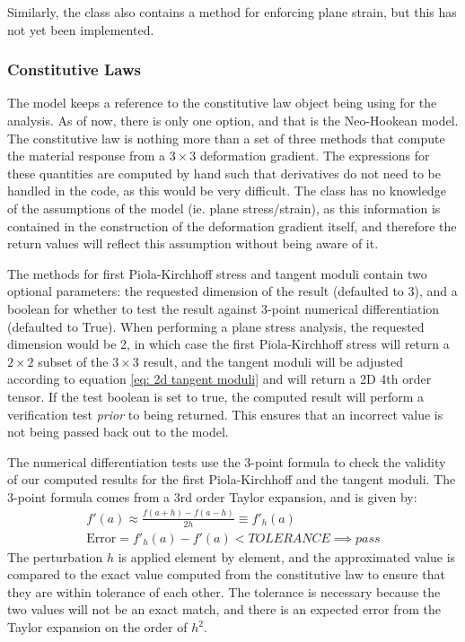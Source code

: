 \documentclass[]{spie}  %
\begin{document}
Similarly, the class also contains a method for enforcing plane strain, but this has not yet been implemented. 

\subsubsection{Constitutive Laws}
The model keeps a reference to the constitutive law object being using for the analysis. As of now, there is only one option, and that is the Neo-Hookean model. The constitutive law is nothing more than a set of three methods that compute the material response from a $3 \times 3$ deformation gradient. The expressions for these quantities are computed by hand such that derivatives do not need to be handled in the code, as this would be very difficult. The class has no knowledge of the assumptions of the model (ie. plane stress/strain), as this information is contained in the construction of the deformation gradient itself, and therefore the return values will reflect this assumption without being aware of it. 

The methods for first Piola-Kirchhoff stress and tangent moduli contain two optional parameters: the requested dimension of the result (defaulted to 3), and a boolean for whether to test the result against 3-point numerical differentiation (defaulted to True). When performing a plane stress analysis, the requested dimension would be 2, in which case the first Piola-Kirchhoff stress will return a $2 \times 2$ subset of the $3 \times 3$ result, and the tangent moduli will be adjusted according to equation \ref{eq: 2d tangent moduli} and will return a 2D 4th order tensor. If the test boolean is set to true, the computed result will perform a verification test \textit{prior} to being returned. This ensures that an incorrect value is not being passed back out to the model. 

The numerical differentiation tests use the 3-point formula to check the validity of our computed results for the first Piola-Kirchhoff and the tangent moduli. The 3-point formula comes from a 3rd order Taylor expansion, and is given by:
\begin{gather}
\label{eq: 3 point formula}
f'(a) \approx \frac{f(a + h) - f(a - h)}{2h} \equiv f'_h(a) \\[1ex]
\textrm{Error} = f'_h(a) - f'(a) < TOLERANCE \implies pass
\end{gather}
The perturbation $h$ is applied element by element, and the approximated value is compared to the exact value computed from the constitutive law to ensure that they are within tolerance of each other. The tolerance is necessary because the two values will not be an exact match, and there is an expected error from the Taylor expansion on the order of $h^2$. 
\end{document}
